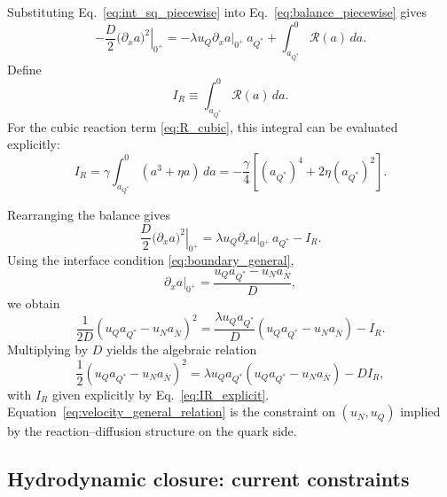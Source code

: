 \documentclass[11pt]{article}
\begin{document}
Substituting Eq.~\eqref{eq:int_sq_piecewise} into Eq.~\eqref{eq:balance_piecewise} gives
\begin{equation}
-\frac{D}{2}\left.\bigl(\partial_x a\bigr)^2\right|_{0^+}
=
- \lambda u_Q \left.\partial_x a\right|_{0^+}\, a_{Q^*}
+
\int_{a_{Q^*}}^{0}\mathcal R(a)\,da.
\end{equation}
Define
\begin{equation}
I_R \equiv \int_{a_{Q^*}}^{0}\mathcal R(a)\,da.
\end{equation}
For the cubic reaction term \eqref{eq:R_cubic}, this integral can be evaluated explicitly:
\begin{equation}
I_R
=
\gamma\int_{a_{Q^*}}^{0}\left(a^3+\eta a\right)\,da
=
-\frac{\gamma}{4}\left[(a_{Q^*})^4+2\eta (a_{Q^*})^2\right].
\label{eq:IR_explicit}
\end{equation}

Rearranging the balance gives
\begin{equation}
\frac{D}{2}\left.\bigl(\partial_x a\bigr)^2\right|_{0^+}
=
\lambda u_Q \left.\partial_x a\right|_{0^+}\, a_{Q^*}
-
I_R.
\label{eq:pre_velocity}
\end{equation}
Using the interface condition \eqref{eq:boundary_general},
\begin{equation}
\left.\partial_x a\right|_{0^+}
=
\frac{u_Q a_{Q^*} - u_N a_{\bar N}}{D},
\end{equation}
we obtain
\begin{equation}
\frac{1}{2D}\left(u_Q a_{Q^*} - u_N a_{\bar N}\right)^2
=
\frac{\lambda u_Q a_{Q^*}}{D}\left(u_Q a_{Q^*} - u_N a_{\bar N}\right)
-
I_R.
\end{equation}
Multiplying by $D$ yields the algebraic relation
\begin{equation}
\frac12\left(u_Q a_{Q^*} - u_N a_{\bar N}\right)^2
=
\lambda u_Q a_{Q^*}\left(u_Q a_{Q^*} - u_N a_{\bar N}\right)
-
D I_R,
\label{eq:velocity_general_relation}
\end{equation}
with $I_R$ given explicitly by Eq.~\eqref{eq:IR_explicit}.
Equation~\eqref{eq:velocity_general_relation} is the constraint on $(u_N,u_Q)$
implied by the reaction--diffusion structure on the quark side.

\subsection*{Hydrodynamic closure: current constraints}
\end{document}
